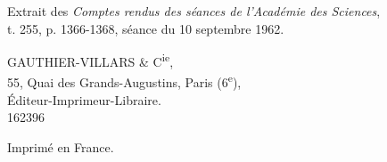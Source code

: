 \begin{center}
Extrait des \emph{Comptes rendus des séances de l'Académie des Sciences},\\
t. 255, p. 1366-1368, séance du 10 septembre 1962.

GAUTHIER-VILLARS \& C\textsuperscript{ie},\\
55, Quai des Grands-Augustins, Paris (6\textsuperscript{e}),\\
Éditeur-Imprimeur-Libraire.\\
162396

Imprimé en France.
\end{center}
